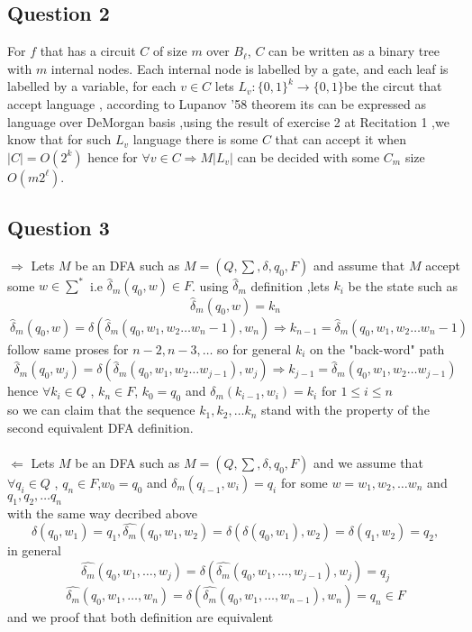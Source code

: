 \documentclass[12pt]{article}
\begin{document}
\subsection*{Question 2}
For $f$ that has a circuit $C$ of size $m$ over $B_\ell$,
$C$ can be written as a binary tree with $m$ internal nodes. Each internal node is
labelled by a gate, and each leaf is labelled by a variable,
for each $v \in C$ lets $L_v: \lbrace0, 1\rbrace
^k \rightarrow \lbrace0, 1\rbrace $be the circut that accept language , according to Lupanov '58 theorem its can be expressed as language over DeMorgan basis ,using the result of exercise 2 at Recitation 1 ,we know that for such $L_v$ language there is some $C$ that can accept it when  $|C|=O(2^k)$
hence for $\forall v \in C \Rightarrow M|L_v|$ can be decided with some $C_m$ size $O(m2^\ell)$.
\subsection*{Question 3}
$\Longrightarrow$ Lets $M$ be an DFA such as $M=(Q,\sum,\delta,q_0,F)$ and assume that $M$ accept some $w \in \sum ^*
$ i.e $\hat{\delta}_{m}  (q_0,w) \in F$. using $\hat{\delta}_{m}$ definition ,lets $k_i$ be the state such as 
\[
\ \hat{\delta}_{m} (q_0,w)=k_{n}
\]
\[
\ \hat{\delta}_{m} (q_0,w)=\delta (\hat{\delta}_{m} (q_0,w_1,w_2\dots w_n-1),w_n)\Rightarrow k_{n-1}=\hat{\delta}_{m} (q_0,w_1,w_2\dots w_n-1)
\]
follow same proses for $n-2,n-3,\dots$ so for general $k_i$ on the "back-word" path
\[
\ \hat{\delta}_{m} (q_0,w_j)=\delta (\hat{\delta}_{m} (q_0,w_1,w_2\dots w_{j-1}),w_j)\Rightarrow k_{j-1}=\hat{\delta}_{m} (q_0,w_1,w_2\dots w_{j-1})
\]
hence $\forall k_i \in Q$ , $k_n \in F$,  $k_0=q_0$ and $\delta_m (k_{i-1},w_i)=k_i$ for $1 \leq i \leq n$ \\so we can claim that the sequence $k_1,k_2,\dots k_n$ stand with the property of the second equivalent DFA definition.\\\\
$\Longleftarrow$ Lets $M$ be an DFA such as $M=(Q,\sum,\delta,q_0,F)$ and we assume that\\ $\forall q_i \in Q$ , $q_n \in F$,$w_0=q_0$ and $\delta_m (q_{i-1},w_i)=q_i$ for some $w=w_1,w_2, \dots w_n$ and $q_1,q_2, \dots q_n$
\\ with the same way decribed above 
\[
\ \delta (q_0,w_1)=q_1,\hat{\delta_m}(q_0,w_1,w_2)=\delta ( \delta (q_0,w_1),w_2)=\delta( q_1,w_2)=q_2,
\]
in general
\[
\ \hat{\delta_m}(q_0,w_1,\dots ,w_j)=\delta ( \hat{\delta_m} (q_0,w_1,\dots ,w_{j-1}),w_j)=q_j
\]
\[
\ \hat{\delta_m}(q_0,w_1,\dots ,w_n)=\delta ( \hat{\delta_m} (q_0,w_1,\dots ,w_{n-1}),w_n)=q_n \in F
\]
and we proof that both definition are equivalent
\end{document}
